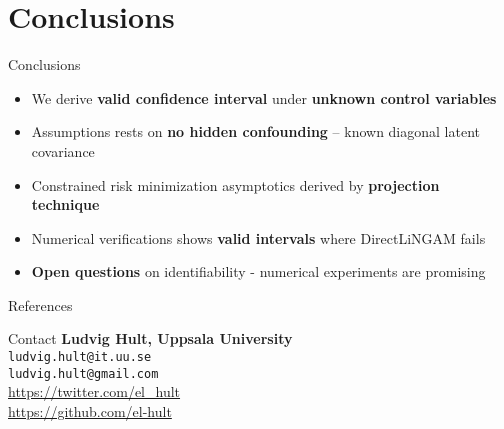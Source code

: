\documentclass[aspectratio=1610]{beamer}
\begin{document}
\section{Conclusions}

\begin{frame}{Conclusions}
    \begin{itemize}[<+->]
        \item We derive \textbf{valid confidence interval} under \textbf{unknown control variables}
        \item Assumptions rests on \textbf{no hidden confounding} -- known diagonal latent covariance
        \item Constrained risk minimization asymptotics derived by \textbf{projection technique}
        \item Numerical verifications shows \textbf{valid intervals} where DirectLiNGAM fails
        \item \textbf{Open questions} on identifiability - numerical experiments are promising
    \end{itemize}
\end{frame}

\begin{frame}[allowframebreaks]{References}
    \printbibliography[heading=none]
\end{frame}

\begin{frame}{Contact}
    \textbf{Ludvig Hult, Uppsala University}\\
    \texttt{ludvig.hult@it.uu.se}\\
    \texttt{ludvig.hult@gmail.com}\\
    \url{https://twitter.com/el_hult}\\
    \url{https://github.com/el-hult}
\end{frame}
\end{document}
